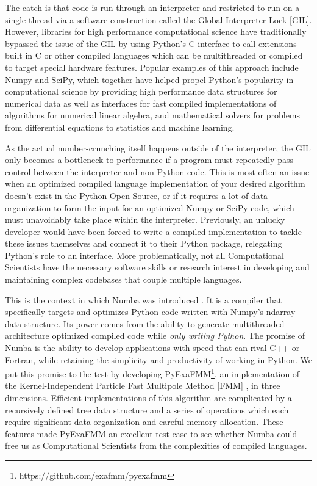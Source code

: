 \documentclass{IEEEcsmag}
\begin{document}
The catch is that code is run through an interpreter and restricted to run on a single thread via a software construction called the Global Interpreter Lock [GIL]. However, libraries for high performance computational science have traditionally bypassed the issue of the GIL by using Python's C interface to call extensions built in C or other compiled languages which can be multithreaded or compiled to target special hardware features. Popular examples of this approach include Numpy and SciPy, which together have helped propel Python's popularity in computational science by providing high performance data structures for numerical data as well as interfaces for fast compiled implementations of algorithms for numerical linear algebra, and mathematical solvers for problems from differential equations to statistics and machine learning.

As the actual number-crunching itself happens outside of the interpreter, the GIL only becomes a bottleneck to performance if a program must repeatedly pass control between the interpreter and non-Python code. This is most often an issue when an optimized compiled language implementation of your desired algorithm doesn't exist in the Python Open Source, or if it requires a lot of data organization to form the input for an optimized Numpy or SciPy code, which must unavoidably take place within the interpreter. Previously, an unlucky developer would have been forced to write a compiled implementation to tackle these issues themselves and connect it to their Python package, relegating Python's role to an interface. More problematically, not all Computational Scientists have the necessary software skills or research interest in developing and maintaining complex codebases that couple multiple languages.

This is the context in which Numba was introduced \cite{Lam2015}. It is a compiler that specifically targets and optimizes Python code written with Numpy's ndarray data structure. Its power comes from the ability to generate multithreaded architecture optimized compiled code while \textit{only writing Python}. The promise of Numba is the ability to develop applications with speed that can rival C++ or Fortran, while retaining the simplicity and productivity of working in Python. We put this promise to the test by developing PyExaFMM\footnote{https://github.com/exafmm/pyexafmm}, an implementation of the Kernel-Independent Particle Fast Multipole Method [FMM] \cite{Ying2004,Greengard1987}, in three dimensions. Efficient implementations of this algorithm are complicated by a recursively defined tree data structure and a series of operations which each require significant data organization and careful memory allocation. These features made PyExaFMM an excellent test case to see whether Numba could free us as Computational Scientists from the complexities of compiled languages.
\end{document}
